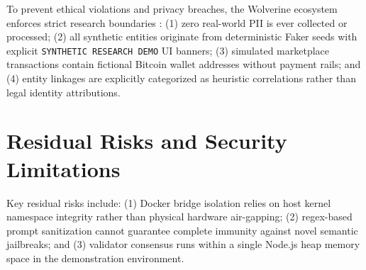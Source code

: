 To prevent ethical violations and privacy breaches, the Wolverine ecosystem enforces strict research boundaries \cite{dwork2006differential, nowok2016synthpop}: (1) zero real-world PII is ever collected or processed; (2) all synthetic entities originate from deterministic Faker seeds with explicit \texttt{SYNTHETIC RESEARCH DEMO} UI banners; (3) simulated marketplace transactions contain fictional Bitcoin wallet addresses without payment rails; and (4) entity linkages are explicitly categorized as heuristic correlations rather than legal identity attributions.

\section{Residual Risks and Security Limitations}
\label{sec:sec_limitations}

Key residual risks include: (1) Docker bridge isolation relies on host kernel namespace integrity rather than physical hardware air-gapping; (2) regex-based prompt sanitization cannot guarantee complete immunity against novel semantic jailbreaks; and (3) validator consensus runs within a single Node.js heap memory space in the demonstration environment.
